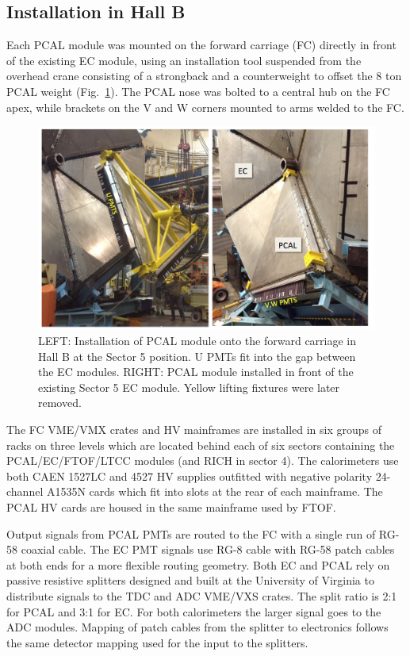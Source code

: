 \subsection{Installation in Hall B}
Each PCAL module was mounted on the forward carriage (FC) directly in front of the existing EC module, using an installation tool suspended from the overhead crane consisting of a strongback and a counterweight to offset the 8 ton PCAL weight (Fig.~\ref{fig:S5_1}).  The PCAL nose was bolted to a central hub on the FC apex, while brackets on the V and W corners mounted to arms welded to the FC.   

\begin{figure}[hbt]
\centering
\includegraphics[width=0.95\columnwidth,keepaspectratio]{img/S5_1.png}
\caption{LEFT: Installation of PCAL module onto the forward carriage in Hall B at the Sector 5 position. U PMTs fit into the gap between the EC modules. RIGHT: PCAL module installed in front of the existing Sector 5 EC module. Yellow lifting fixtures were later removed. }
\label{fig:S5_1}
\end{figure}

The FC VME/VMX crates and HV mainframes are installed in six groups of racks on three levels which are located behind each of six sectors containing the PCAL/EC/FTOF/LTCC modules (and RICH in sector 4). The calorimeters use both CAEN 1527LC and 4527 HV supplies
outfitted with negative polarity 24-channel A1535N cards which fit into slots at the rear of each mainframe. The PCAL HV cards are housed in the same mainframe used by FTOF.  

Output signals from PCAL PMTs are routed to the FC with a single run of RG-58 coaxial cable. The EC PMT signals use RG-8 cable with RG-58 patch cables at both ends for a more flexible routing geometry.  Both EC and PCAL rely on passive resistive splitters designed and built at the University of Virginia to distribute signals to the TDC and ADC VME/VXS crates.  The split ratio is 2:1 for PCAL and 3:1 for EC.  For both calorimeters the larger signal goes to the ADC modules.  Mapping of patch cables from the splitter to electronics follows the same detector mapping used for the input to the splitters.

